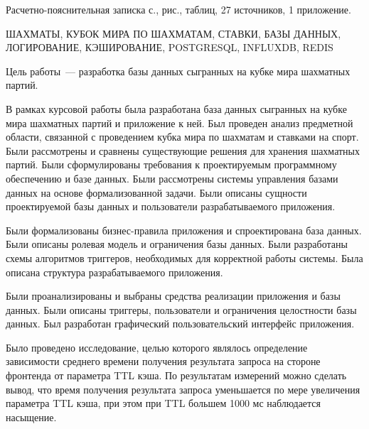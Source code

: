 
Расчетно-пояснительная записка \pageref{LastPage} с., \totalfigures{} рис., \totaltables{} таблиц, 27 источников, 1 приложение.

ШАХМАТЫ, КУБОК МИРА ПО ШАХМАТАМ, СТАВКИ, БАЗЫ ДАННЫХ, ЛОГИРОВАНИЕ, КЭШИРОВАНИЕ, POSTGRESQL, INFLUXDB, REDIS

Цель работы~--- разработка базы данных сыгранных на кубке мира шахматных партий.

В рамках курсовой работы была разработана база данных сыгранных на кубке мира шахматных партий и приложение к ней. Был проведен анализ предметной области, связанной с проведением кубка мира по шахматам и ставками на спорт. Были рассмотрены и сравнены существующие решения для хранения шахматных партий. Были сформулированы требования к проектируемым программному обеспечению и базе данных. Были рассмотрены системы управления базами данных на основе формализованной задачи. Были описаны сущности проектируемой базы данных и пользователи разрабатываемого приложения.

Были формализованы бизнес-правила приложения и спроектирована база данных. Были описаны ролевая модель и ограничения базы данных. Были разработаны схемы алгоритмов триггеров, необходимых для корректной работы системы. Была описана структура разрабатываемого приложения.

Были проанализированы и выбраны средства реализации приложения и базы данных. Были описаны триггеры, пользователи и ограничения целостности базы данных. Был разработан графический пользовательский интерфейс приложения.

Было проведено исследование, целью которого являлось определение зависимости среднего времени получения результата запроса на стороне фронтенда от параметра TTL кэша. По результатам измерений можно сделать вывод, что время получения результата запроса уменьшается по мере увеличения параметра TTL кэша, при этом при TTL большем 1000 мс наблюдается насыщение.
